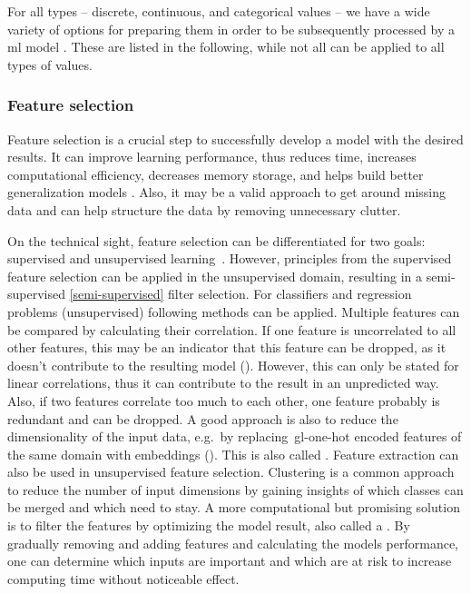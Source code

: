 For all types -- discrete, continuous, and categorical values -- we have a wide variety of options for preparing them in order to be subsequently processed by a \gls{ml} model \cite{duong2021}.
These are listed in the following, while not all can be applied to all types of values.

\subsubsection{Feature selection}

Feature selection is a crucial step to successfully develop a model with the desired results.
It can improve learning performance, thus reduces time, increases computational efficiency, decreases memory storage, and helps build better generalization models \cite{li2017feature}.
Also, it may be a valid approach to get around missing data and can help structure the data by removing unnecessary clutter.

On the technical sight, feature selection can be differentiated for two goals: supervised and unsupervised learning~\cite{li2017feature}.
However, principles from the supervised feature selection can be applied in the unsupervised domain, resulting in a semi-supervised \ref{semi-supervised} filter selection.
For classifiers and regression problems (unsupervised) following methods can be applied.
Multiple features can be compared by calculating their correlation.
If one feature is uncorrelated to all other features, this may be an indicator that this feature can be dropped, as it doesn't contribute to the resulting model ().
However, this can only be stated for linear correlations, thus it can contribute to the result in an unpredicted way.
Also, if two features correlate too much to each other, one feature probably is redundant and can be dropped.
A good approach is also to reduce the dimensionality of the input data, e.g.\ by replacing~\gls{gl-one-hot} encoded features of the same domain with embeddings ().
This is also called .
Feature extraction can also be used in unsupervised feature selection.
Clustering is a common approach to reduce the number of input dimensions by gaining insights of which classes can be merged and which need to stay.
A more computational but promising solution is to filter the features by optimizing the model result, also called a .
By gradually removing and adding features and calculating the models performance, one can determine which inputs are important and which are at risk to increase computing time without noticeable effect.

